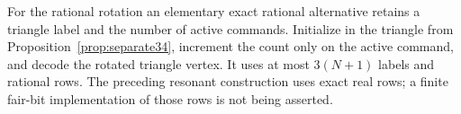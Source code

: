 For the rational rotation an elementary exact rational alternative retains
a triangle label and the number of active commands. Initialize in the
triangle from Proposition~\ref{prop:separate34}, increment the count only
on the active command, and decode the rotated triangle vertex. It uses at
most $3(N+1)$ labels and rational rows. The preceding resonant construction
uses exact real rows; a finite fair-bit implementation of those rows is
not being asserted.
